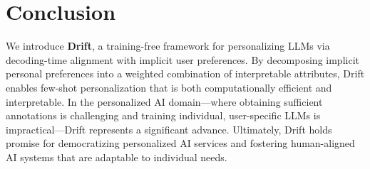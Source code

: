 \section{Conclusion}

We introduce \textbf{Drift}, a training-free framework for personalizing LLMs via decoding-time alignment with implicit user preferences. By decomposing implicit personal preferences into a weighted combination of interpretable attributes, Drift enables few-shot personalization that is both computationally efficient and interpretable. 
In the personalized AI domain—where obtaining sufficient annotations is challenging and training individual, user-specific LLMs is impractical—Drift represents a significant advance. Ultimately, Drift holds promise for democratizing personalized AI services and fostering human-aligned AI systems that are adaptable to individual needs.


